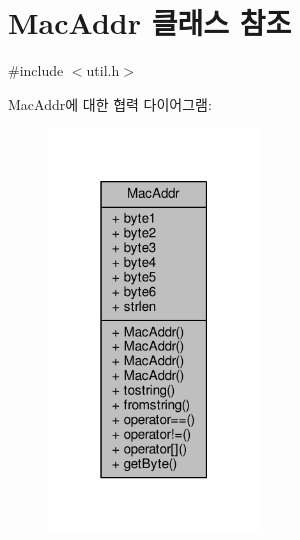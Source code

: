 \hypertarget{classavdecc__lib_1_1utility_1_1_mac_addr}{}\section{Mac\+Addr 클래스 참조}
\label{classavdecc__lib_1_1utility_1_1_mac_addr}


{\ttfamily \#include $<$util.\+h$>$}



Mac\+Addr에 대한 협력 다이어그램\+:
\nopagebreak
\begin{figure}[H]
\begin{center}
\leavevmode
\includegraphics[width=159pt]{classavdecc__lib_1_1utility_1_1_mac_addr__coll__graph}
\end{center}
\end{figure}
